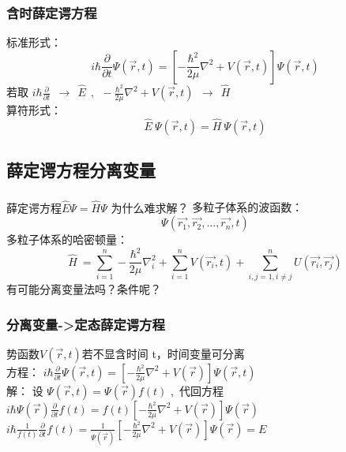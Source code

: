 \begin{frame}
	\frametitle{含时薛定谔方程}
	标准形式：   \\ 
	 \begin{equation*}
		i\hbar \frac{\partial }{\partial t} \Psi (\overrightarrow{r},t ) =\left [ -\frac{\hbar^2}{2\mu }\nabla ^2 + V(\overrightarrow{r},t ) \right ]\Psi (\overrightarrow{r}, t ) 
	\end{equation*}
	若取 $ \displaystyle  i\hbar \frac{\partial }{\partial t} ~~\to ~~ \hat{E} ~~, ~~  -\frac{\hbar^2}{2\mu }\nabla ^2 + V(\vec{r},t ) ~~\to ~~ \hat{H} $ \\
	算符形式：   \\ 
	\begin{equation*}
		\hat{E} ~ \Psi (\overrightarrow{r},t )  = \hat{H} ~ \Psi (\overrightarrow{r},t )  
	\end{equation*}
\end{frame}

\subsection{薛定谔方程分离变量}

\begin{frame}
	\frametitle{}
	\begin{alertblock} {薛定谔方程$\hat{E} \Psi = \hat{H}  \Psi $ 为什么难求解？}
		多粒子体系的波函数：
		\begin{equation*}
			\Psi (\vec{r_1},\vec{r_2},...,\vec{r_n},t )
		\end{equation*}		
		多粒子体系的哈密顿量：
		\begin{equation*}
			\hat{H} ~=\sum_{i=1}^{n} -\frac{\hbar^2}{2\mu }\nabla ^2 _i + \sum_{i=1}^{n} V(\vec{r_i},t) + \sum_{i,j=1, i\ne j}^{n}  U(\vec{r_i},\vec{r_j}) 
		\end{equation*}	
		有可能分离变量法吗？条件呢？
	\end{alertblock}	
\end{frame}

\begin{frame}
\frametitle{分离变量->定态薛定谔方程}
	势函数$V(\vec{r},t ) $若不显含时间 t，时间变量可分离 \\ \vspace{0.3cm}
	方程： { $ \displaystyle i \hbar \frac{\partial }{\partial t} \Psi (\vec{r},t ) =\left [- \frac{\hbar^2}{2\mu }\nabla ^2 + V(\vec{r}) \right ]\Psi (\vec{r},t ) $}  \\  \vspace{0.3cm}
	\alert{解：}  设  $\Psi (\vec{r},t )  = \Psi (\vec{r} ) f(t) $ , 代回方程 \\ 
	{ $ \displaystyle i\hbar \Psi (\vec{r})  \frac{\partial }{\partial t} f(t)=f(t) \left [ -\frac{\hbar^2}{2\mu }\nabla ^2 + V(\vec{r}) \right ]\Psi (\vec{r}) $}  \\ 	
	{ $ \displaystyle i\hbar \frac{1}{f(t)}  \frac{\partial }{\partial t} f(t)= \frac{1}{\Psi (\vec{r}) } \left [ -\frac{\hbar^2}{2\mu }\nabla ^2 + V(\vec{r}) \right ]\Psi (\vec{r}) =E $}  \\ 	
\end{frame}

